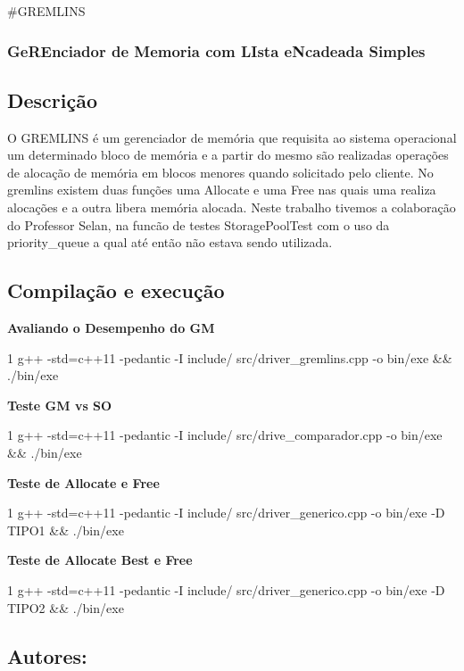 \#\+G\+R\+E\+M\+L\+I\+NS \subsubsection*{Ge\+R\+Enciador de Memoria com L\+Ista e\+Ncadeada Simples}

\subsection*{Descrição}

O G\+R\+E\+M\+L\+I\+NS é um gerenciador de memória que requisita ao sistema operacional um determinado bloco de memória e a partir do mesmo são realizadas operações de alocação de memória em blocos menores quando solicitado pelo cliente. No gremlins existem duas funções uma Allocate e uma Free nas quais uma realiza alocações e a outra libera memória alocada. Neste trabalho tivemos a colaboração do Professor Selan, na funcão de testes Storage\+Pool\+Test com o uso da priority\+\_\+queue a qual até então não estava sendo utilizada.

\subsection*{Compilação e execução}

{\bfseries Avaliando o Desempenho do GM} 
\begin{DoxyCode}
1 g++ -std=c++11 -pedantic -I include/ src/driver\_gremlins.cpp -o bin/exe && ./bin/exe
\end{DoxyCode}


{\bfseries Teste GM vs SO} 
\begin{DoxyCode}
1 g++ -std=c++11 -pedantic -I include/ src/drive\_comparador.cpp -o bin/exe && ./bin/exe 
\end{DoxyCode}


{\bfseries Teste de Allocate e Free} 
\begin{DoxyCode}
1 g++ -std=c++11 -pedantic -I include/ src/driver\_generico.cpp -o bin/exe -D TIPO1 && ./bin/exe
\end{DoxyCode}


{\bfseries Teste de Allocate Best e Free} 
\begin{DoxyCode}
1 g++ -std=c++11 -pedantic -I include/ src/driver\_generico.cpp -o bin/exe -D TIPO2 && ./bin/exe
\end{DoxyCode}
 \subsection*{Autores\+:}

